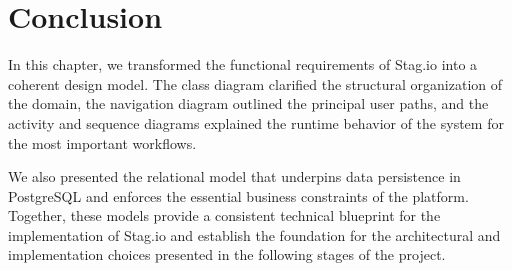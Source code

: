 \section{Conclusion}

In this chapter, we transformed the functional requirements of Stag.io into a coherent design model. The class diagram clarified the structural organization of the domain, the navigation diagram outlined the principal user paths, and the activity and sequence diagrams explained the runtime behavior of the system for the most important workflows.

We also presented the relational model that underpins data persistence in PostgreSQL and enforces the essential business constraints of the platform. Together, these models provide a consistent technical blueprint for the implementation of Stag.io and establish the foundation for the architectural and implementation choices presented in the following stages of the project.

